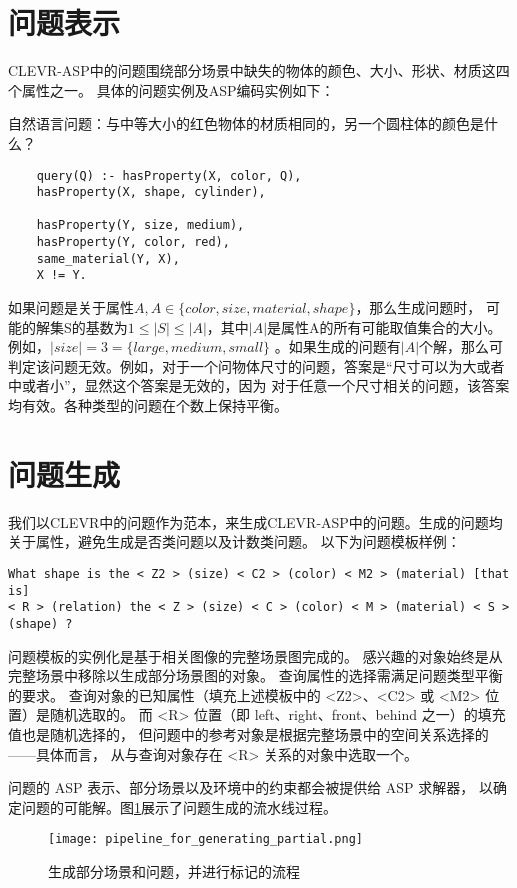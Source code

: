 \section{问题表示}
CLEVR-ASP中的问题围绕部分场景中缺失的物体的颜色、大小、形状、材质这四个属性之一。
具体的问题实例及ASP编码实例如下：

自然语言问题：与中等大小的红色物体的材质相同的，另一个圆柱体的颜色是什么？
\begin{lstlisting}
    query(Q) :- hasProperty(X, color, Q),
    hasProperty(X, shape, cylinder),

    hasProperty(Y, size, medium),
    hasProperty(Y, color, red),
    same_material(Y, X),
    X != Y.
\end{lstlisting}

如果问题是关于属性$A, A \in \{ color, size, material, shape\}$，那么生成问题时，
可能的解集S的基数为$1 \leq |S| \leq |A|$，其中$|A|$是属性A的所有可能取值集合的大小。例如，$|size| = 3 =\{ large, medium, small\}$
。如果生成的问题有$|A|$个解，那么可判定该问题无效。例如，对于一个问物体尺寸的问题，答案是“尺寸可以为大或者中或者小”，显然这个答案是无效的，因为
对于任意一个尺寸相关的问题，该答案均有效。各种类型的问题在个数上保持平衡。
\section{问题生成}
我们以CLEVR中的问题作为范本，来生成CLEVR-ASP中的问题。生成的问题均关于属性，避免生成是否类问题以及计数类问题。
以下为问题模板样例：
\begin{lstlisting}
What shape is the < Z2 > (size) < C2 > (color) < M2 > (material) [that is] 
< R > (relation) the < Z > (size) < C > (color) < M > (material) < S > (shape) ?
\end{lstlisting}

问题模板的实例化是基于相关图像的完整场景图完成的。
感兴趣的对象始终是从完整场景中移除以生成部分场景图的对象。
查询属性的选择需满足问题类型平衡的要求。
查询对象的已知属性（填充上述模板中的 <Z2>、<C2> 或 <M2> 位置）是随机选取的。
而 <R> 位置（即 left、right、front、behind 之一）的填充值也是随机选择的，
但问题中的参考对象是根据完整场景中的空间关系选择的——具体而言，
从与查询对象存在 <R> 关系的对象中选取一个。

问题的 ASP 表示、部分场景以及环境中的约束都会被提供给 ASP 求解器，
以确定问题的可能解。图\ref{pipeline_for_generating_partial}展示了问题生成的流水线过程。
\begin{figure}
    \centering
    \texttt{[image: pipeline\_for\_generating\_partial.png]}
    \caption{生成部分场景和问题，并进行标记的流程}
    \label{pipeline_for_generating_partial}
\end{figure}
